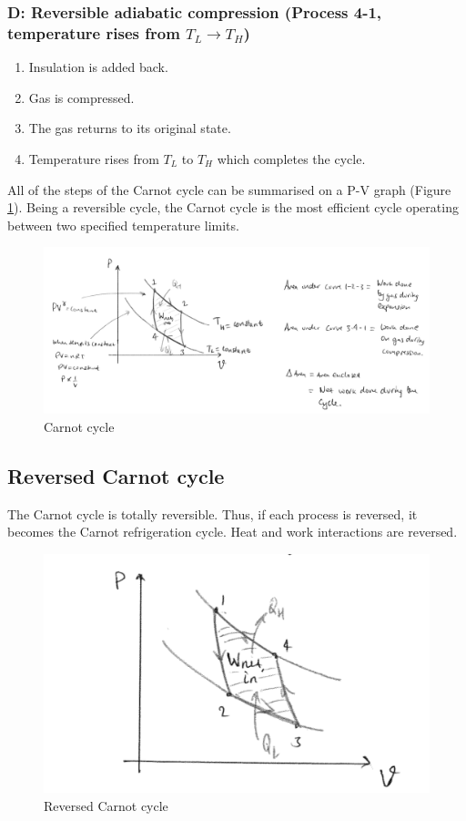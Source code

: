 \documentclass[class=report, crop=false, 12pt,a4paper]{standalone}
\begin{document}
\subsubsection{D: Reversible adiabatic compression (Process 4-1, temperature rises from $T_L \rightarrow T_H$)}
\begin{enumerate}[noitemsep]
  \item Insulation is added back.
  \item Gas is compressed.
  \item The gas returns to its original state.
  \item Temperature rises from $T_L$ to $T_H$ which completes the cycle.
\end{enumerate}
All of the steps of the Carnot cycle can be summarised on a P-V graph (Figure \ref{carnotcycle}). Being a reversible cycle, the Carnot cycle is the most efficient cycle operating between two specified temperature limits.
\begin{figure}[H]
  \centering
    \includegraphics[width = \textwidth]{../img/CarnotCycle}
    \caption{Carnot cycle}
    \label{carnotcycle}
\end{figure}
\subsection{Reversed Carnot cycle} \label{reversecarnot}
The Carnot cycle is totally reversible. Thus, if each process is reversed, it becomes the Carnot refrigeration cycle. Heat and work interactions are reversed. 
\begin{figure}[H]
  \centering
    \includegraphics[width = \textwidth]{../img/ReversedCarnotCycle}
    \caption{Reversed Carnot cycle}
\end{figure}
\end{document}
